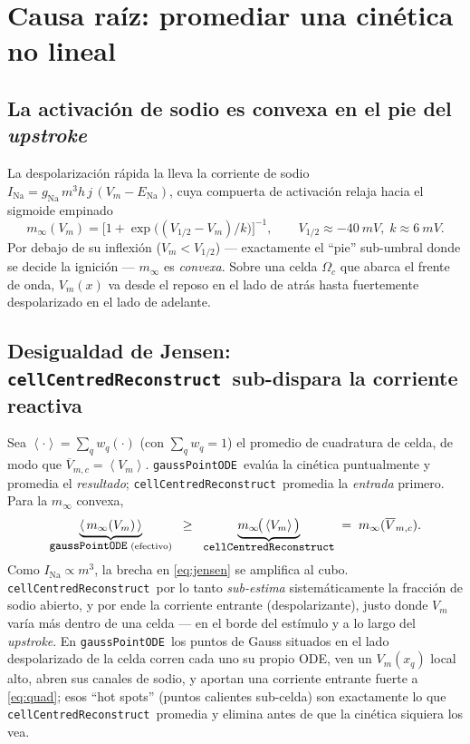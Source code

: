 \documentclass[11pt,a4paper]{article}
\newcommand{\Vm}{V_{m}}
\newcommand{\code}[1]{\texttt{\small #1}}
\newcommand{\gpode}{\code{gaussPointODE}}
\newcommand{\ccrec}{\code{cellCentredReconstruct}}
\newcommand{\Vbarc}{\overline{V}_{m,c}}
\newcommand{\avg}[1]{\left\langle #1 \right\rangle}
\newcommand{\Omegac}{\Omega_{c}}
\begin{document}
\section{Causa raíz: promediar una cinética no lineal}

\subsection{La activación de sodio es convexa en el pie del \emph{upstroke}}

La despolarización rápida la lleva la corriente de sodio
$I_{\mathrm{Na}}=g_{\mathrm{Na}}\,m^{3}h\,j\,(\Vm-E_{\mathrm{Na}})$, cuya
compuerta de activación relaja hacia el sigmoide empinado
\begin{equation}
  m_\infty(\Vm)=\Big[1+\exp\!\big((V_{1/2}-\Vm)/k\big)\Big]^{-1},
  \qquad V_{1/2}\approx\SI{-40}{mV},\; k\approx\SI{6}{mV}.
\end{equation}
Por debajo de su inflexión ($\Vm<V_{1/2}$) --- exactamente el ``pie''
sub-umbral donde se decide la ignición --- $m_\infty$ es \emph{convexa}. Sobre una
celda $\Omegac$ que abarca el frente de onda, $\Vm(x)$ va desde el reposo en el
lado de atrás hasta fuertemente despolarizado en el lado de adelante.

\subsection{Desigualdad de Jensen: \ccrec\ sub-dispara la corriente reactiva}

Sea $\avg{\cdot}=\sum_q w_q(\cdot)$ (con $\sum_q w_q=1$) el promedio de
cuadratura de celda, de modo que $\Vbarc=\avg{\Vm}$. \gpode\ evalúa la cinética
puntualmente y promedia el \emph{resultado}; \ccrec\ promedia la \emph{entrada}
primero. Para la $m_\infty$ convexa,
\begin{equation}
  \underbrace{\avg{\,m_\infty(\Vm)\,}}_{\text{\gpode\ (efectivo)}}
  \;\;\ge\;\;
  \underbrace{m_\infty\!\big(\avg{\Vm}\big)}_{\text{\ccrec}}
  \;=\; m_\infty(\Vbarc).
  \label{eq:jensen}
\end{equation}
Como $I_{\mathrm{Na}}\propto m^{3}$, la brecha en \eqref{eq:jensen} se amplifica al
cubo. \ccrec\ por lo tanto \emph{sub-estima} sistemáticamente la fracción de sodio
abierto, y por ende la corriente entrante (despolarizante), justo donde $\Vm$ varía
más dentro de una celda --- en el borde del estímulo y a lo largo del
\emph{upstroke}. En \gpode\ los puntos de Gauss situados en el lado despolarizado
de la celda corren cada uno su propio ODE, ven un $\Vm(x_q)$ local alto, abren sus
canales de sodio, y aportan una corriente entrante fuerte a \eqref{eq:quad}; esos
``hot spots'' (puntos calientes sub-celda) son exactamente lo que \ccrec\ promedia
y elimina antes de que la cinética siquiera los vea.
\end{document}
